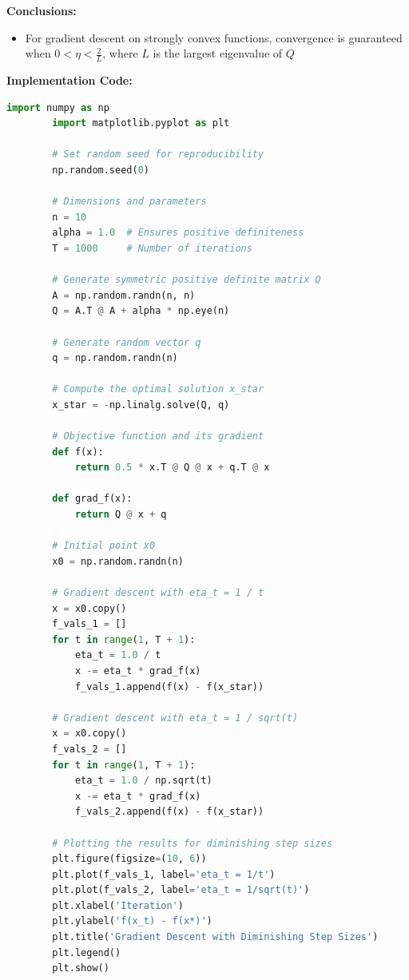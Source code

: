 \documentclass{article}
\begin{document}
\begin{enumerate}
\begin{enumerate}
        \textbf{Conclusions:}
        \begin{itemize}
            \item For gradient descent on strongly convex functions, convergence is guaranteed when $0 < \eta < \frac{2}{L}$, where $L$ is the largest eigenvalue of $Q$
        \end{itemize}

        \textbf{Implementation Code:}
        \begin{lstlisting}[language=Python, breaklines=true]
        import numpy as np
        import matplotlib.pyplot as plt

        # Set random seed for reproducibility
        np.random.seed(0)

        # Dimensions and parameters
        n = 10
        alpha = 1.0  # Ensures positive definiteness
        T = 1000     # Number of iterations

        # Generate symmetric positive definite matrix Q
        A = np.random.randn(n, n)
        Q = A.T @ A + alpha * np.eye(n)

        # Generate random vector q
        q = np.random.randn(n)

        # Compute the optimal solution x_star
        x_star = -np.linalg.solve(Q, q)

        # Objective function and its gradient
        def f(x):
            return 0.5 * x.T @ Q @ x + q.T @ x

        def grad_f(x):
            return Q @ x + q

        # Initial point x0
        x0 = np.random.randn(n)

        # Gradient descent with eta_t = 1 / t
        x = x0.copy()
        f_vals_1 = []
        for t in range(1, T + 1):
            eta_t = 1.0 / t
            x -= eta_t * grad_f(x)
            f_vals_1.append(f(x) - f(x_star))

        # Gradient descent with eta_t = 1 / sqrt(t)
        x = x0.copy()
        f_vals_2 = []
        for t in range(1, T + 1):
            eta_t = 1.0 / np.sqrt(t)
            x -= eta_t * grad_f(x)
            f_vals_2.append(f(x) - f(x_star))

        # Plotting the results for diminishing step sizes
        plt.figure(figsize=(10, 6))
        plt.plot(f_vals_1, label='eta_t = 1/t')
        plt.plot(f_vals_2, label='eta_t = 1/sqrt(t)')
        plt.xlabel('Iteration')
        plt.ylabel('f(x_t) - f(x*)')
        plt.title('Gradient Descent with Diminishing Step Sizes')
        plt.legend()
        plt.show()


\end{lstlisting}
\end{enumerate}
\end{enumerate}
\end{document}
